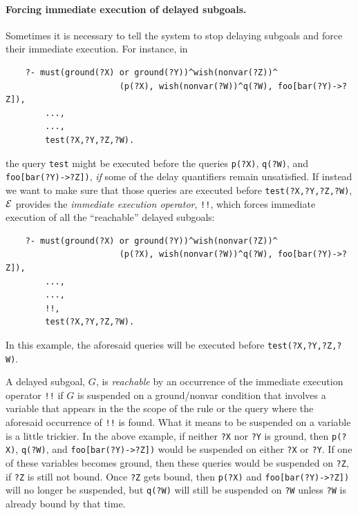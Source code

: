 \documentclass[11pt]{article}
\newcommand{\ERGO}{\mbox{\ensuremath{\cal{E}}\smaller{{\sc{RGO}}}}\xspace}
\newcommand{\FLSYSTEM}{\ERGO}
\begin{document}
\paragraph{Forcing immediate execution of delayed subgoals.}
Sometimes it is necessary to tell the system to stop delaying
subgoals and force their immediate execution.
For instance, in
\begin{verbatim}
    ?- must(ground(?X) or ground(?Y))^wish(nonvar(?Z))^
                       (p(?X), wish(nonvar(?W))^q(?W), foo[bar(?Y)->?Z]),
        ...,
        ...,
        test(?X,?Y,?Z,?W).
\end{verbatim}
the query \texttt{test} might be executed before the queries \texttt{p(?X)},
\texttt{q(?W)}, and \texttt{foo[bar(?Y)->?Z])}, \emph{if} some of the
delay quantifiers remain unsatisfied. If instead we want
to make sure that those queries are executed before
\texttt{test(?X,?Y,?Z,?W)}, \FLSYSTEM provides the \emph{immediate execution
operator}, \texttt{!!},
which forces immediate execution of all the ``reachable'' delayed subgoals:
\begin{verbatim}
    ?- must(ground(?X) or ground(?Y))^wish(nonvar(?Z))^
                       (p(?X), wish(nonvar(?W))^q(?W), foo[bar(?Y)->?Z]),
        ...,
        ...,
        !!,
        test(?X,?Y,?Z,?W).
\end{verbatim}
In this example, the aforesaid queries will be executed before
\texttt{test(?X,?Y,?Z,?W)}. 

A delayed subgoal, $G$, is \emph{reachable} by an occurrence of
the immediate execution
operator \texttt{!!} 
if $G$ is suspended on a ground/nonvar condition that
involves a variable that appears in the the scope of the rule or the query
where the aforesaid occurrence of \texttt{!!} is found. 
What it means to be suspended on a variable is a little trickier.
In the above example, if neither \texttt{?X} nor \texttt{?Y} is ground,
then \texttt{p(?X)}, \texttt{q(?W)}, and \texttt{foo[bar(?Y)->?Z])} would
be suspended on either \texttt{?X} or \texttt{?Y}. If one of these
variables becomes ground, then these queries would be suspended on
\texttt{?Z}, if \texttt{?Z} is still not bound.  Once \texttt{?Z}  gets bound,
then \texttt{p(?X)} and \texttt{foo[bar(?Y)->?Z])} will no longer be
suspended, but \texttt{q(?W)} will still be suspended on \texttt{?W} unless
\texttt{?W} is already bound by that time.   
\end{document}

